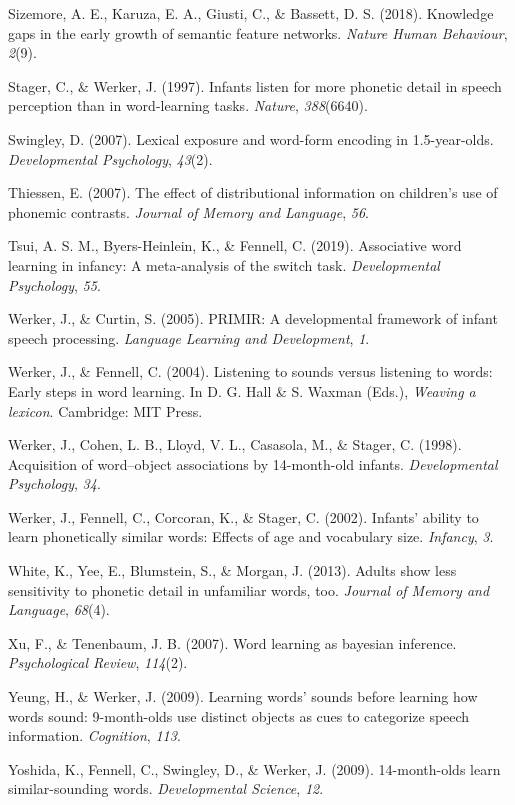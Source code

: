 \documentclass[english,,man,floatsintext]{apa6}
\theoremstyle{definition}
\theoremstyle{definition}
\theoremstyle{definition}
\theoremstyle{remark}
\begin{document}
\hypertarget{ref-sizemore2018}{}
Sizemore, A. E., Karuza, E. A., Giusti, C., \& Bassett, D. S. (2018).
Knowledge gaps in the early growth of semantic feature networks.
\emph{Nature Human Behaviour}, \emph{2}(9).

\hypertarget{ref-stager1997}{}
Stager, C., \& Werker, J. (1997). Infants listen for more phonetic
detail in speech perception than in word-learning tasks. \emph{Nature},
\emph{388}(6640).

\hypertarget{ref-swingley2007}{}
Swingley, D. (2007). Lexical exposure and word-form encoding in
1.5-year-olds. \emph{Developmental Psychology}, \emph{43}(2).

\hypertarget{ref-thiessen2007}{}
Thiessen, E. (2007). The effect of distributional information on
children's use of phonemic contrasts. \emph{Journal of Memory and
Language}, \emph{56}.

\hypertarget{ref-tsui2019}{}
Tsui, A. S. M., Byers-Heinlein, K., \& Fennell, C. (2019). Associative
word learning in infancy: A meta-analysis of the switch task.
\emph{Developmental Psychology}, \emph{55}.

\hypertarget{ref-werker2005}{}
Werker, J., \& Curtin, S. (2005). PRIMIR: A developmental framework of
infant speech processing. \emph{Language Learning and Development},
\emph{1}.

\hypertarget{ref-werker2004}{}
Werker, J., \& Fennell, C. (2004). Listening to sounds versus listening
to words: Early steps in word learning. In D. G. Hall \& S. Waxman
(Eds.), \emph{Weaving a lexicon}. Cambridge: MIT Press.

\hypertarget{ref-werker1998}{}
Werker, J., Cohen, L. B., Lloyd, V. L., Casasola, M., \& Stager, C.
(1998). Acquisition of word--object associations by 14-month-old
infants. \emph{Developmental Psychology}, \emph{34}.

\hypertarget{ref-werker2002}{}
Werker, J., Fennell, C., Corcoran, K., \& Stager, C. (2002). Infants'
ability to learn phonetically similar words: Effects of age and
vocabulary size. \emph{Infancy}, \emph{3}.

\hypertarget{ref-white2013}{}
White, K., Yee, E., Blumstein, S., \& Morgan, J. (2013). Adults show
less sensitivity to phonetic detail in unfamiliar words, too.
\emph{Journal of Memory and Language}, \emph{68}(4).

\hypertarget{ref-xu2007}{}
Xu, F., \& Tenenbaum, J. B. (2007). Word learning as bayesian inference.
\emph{Psychological Review}, \emph{114}(2).

\hypertarget{ref-yeung09}{}
Yeung, H., \& Werker, J. (2009). Learning words' sounds before learning
how words sound: 9-month-olds use distinct objects as cues to categorize
speech information. \emph{Cognition}, \emph{113}.

\hypertarget{ref-yoshida2009}{}
Yoshida, K., Fennell, C., Swingley, D., \& Werker, J. (2009).
14-month-olds learn similar-sounding words. \emph{Developmental
Science}, \emph{12}.
\end{document}
